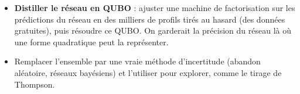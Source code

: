 \begin{pistes}
\begin{itemize}
\item \textbf{Distiller le réseau en QUBO} : ajuster une machine de factorisation sur les prédictions du réseau en des milliers de profils tirés au hasard (des données gratuites), puis résoudre ce QUBO. On garderait la précision du réseau là où une forme quadratique peut la représenter.
\item Remplacer l'ensemble par une vraie méthode d'incertitude (abandon aléatoire, réseaux bayésiens) et l'utiliser pour explorer, comme le tirage de Thompson.
\end{itemize}
\end{pistes}
